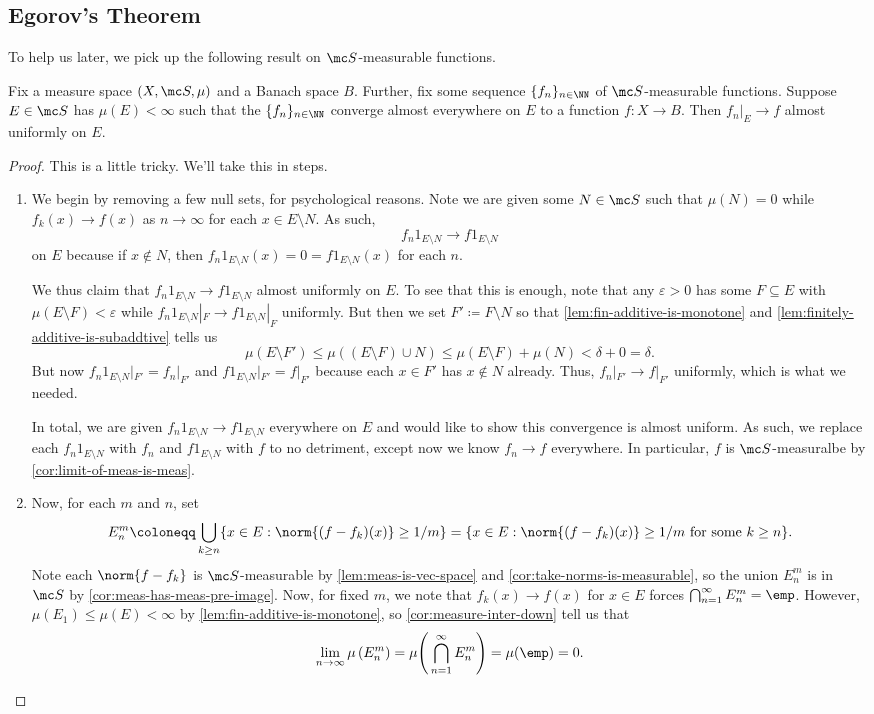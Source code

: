 \documentclass[../notes.tex]{subfiles}
\begin{document}
\subsection{Egorov's Theorem}
To help us later, we pick up the following result on $\mc S$-measurable functions.
\begin{theorem}[Egorov's] \label{thm:ego}
	Fix a measure space $(X,\mc S,\mu)$ and a Banach space $B$. Further, fix some sequence $\{f_n\}_{n\in\NN}$ of $\mc S$-measurable functions. Suppose $E\in\mc S$ has $\mu(E)<\infty$ such that the $\{f_n\}_{n\in\NN}$ converge almost everywhere on $E$ to a function $f\colon X\to B$. Then $f_n|_E\to f$ almost uniformly on $E$.
\end{theorem}
\begin{proof}
	This is a little tricky. We'll take this in steps.
	\begin{enumerate}
		\item We begin by removing a few null sets, for psychological reasons. Note we are given some $N\in\mc S$ such that $\mu(N)=0$ while $f_k(x)\to f(x)$ as $n\to\infty$ for each $x\in E\setminus N$. As such,
		\[f_n1_{E\setminus N}\to f1_{E\setminus N}\]
		on $E$ because if $x\notin N$, then $f_n1_{E\setminus N}(x)=0=f1_{E\setminus N}(x)$ for each $n$.
		
		We thus claim that $f_n1_{E\setminus N}\to f1_{E\setminus N}$ almost uniformly on $E$. To see that this is enough, note that any $\varepsilon>0$ has some $F\subseteq E$ with $\mu(E\setminus F)<\varepsilon$ while $f_n1_{E\setminus N}|_F\to f1_{E\setminus N}|_F$ uniformly. But then we set $F'\coloneqq F\setminus N$ so that \autoref{lem:fin-additive-is-monotone} and \autoref{lem:finitely-additive-is-subaddtive} tells us
		\[\mu(E\setminus F')\le\mu((E\setminus F)\cup N)\le\mu(E\setminus F)+\mu(N)<\delta+0=\delta.\]
		But now $f_n1_{E\setminus N}|_{F'}=f_n|_{F'}$ and $f1_{E\setminus N}|_{F'}=f|_{F'}$ because each $x\in F'$ has $x\notin N$ already. Thus, $f_n|_{F'}\to f|_{F'}$ uniformly, which is what we needed.
	
		In total, we are given $f_n1_{E\setminus N}\to f1_{E\setminus N}$ everywhere on $E$ and would like to show this convergence is almost uniform. As such, we replace each $f_n1_{E\setminus N}$ with $f_n$ and $f1_{E\setminus N}$ with $f$ to no detriment, except now we know $f_n\to f$ everywhere. In particular, $f$ is $\mc S$-measuralbe by \autoref{cor:limit-of-meas-is-meas}.

		\item Now, for each $m$ and $n$, set
		\[E^m_n\coloneqq\bigcup_{k\ge n}\{x\in E:\norm{(f-f_k)(x)}\ge1/m\}=\{x\in E:\norm{(f-f_k)(x)}\ge1/m\text{ for some }k\ge n\}.\]
		Note each $\norm{f-f_k}$ is $\mc S$-measurable by \autoref{lem:meas-is-vec-space} and \autoref{cor:take-norms-is-measurable}, so the union $E^m_n$ is in $\mc S$ by \autoref{cor:meas-has-meas-pre-image}. Now, for fixed $m$, we note that $f_k(x)\to f(x)$ for $x\in E$ forces $\bigcap_{n=1}^\infty E^m_n=\emp$. However, $\mu(E_1)\le\mu(E)<\infty$ by \autoref{lem:fin-additive-is-monotone}, so \autoref{cor:measure-inter-down} tell us that
		\[\lim_{n\to\infty}\mu\left(E^m_n\right)=\mu\Bigg(\bigcap_{n=1}^\infty E^m_n\Bigg)=\mu(\emp)=0.\]


\end{enumerate}
\end{proof}
\end{document}
